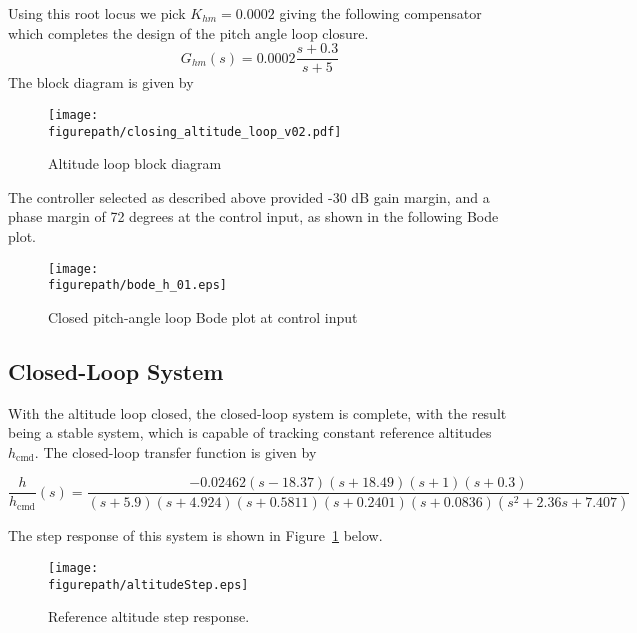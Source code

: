 \documentclass[]{../sty/aiaa-tc}
\newcommand{\figurepath}{../fig}
\theoremstyle{examplestyle}
\begin{document}
  Using this root locus we pick $K_{hm}=0.0002$ giving the following compensator which completes the design of the pitch angle loop closure.
  \begin{equation*}
    G_{hm}(s)=0.0002\frac{s+0.3}{s+5}
  \end{equation*}
  The block diagram is given by
  \begin{figure}[H]
    \begin{center}
      \texttt{[image: \\figurepath/closing\_altitude\_loop\_v02.pdf]}
      \vspace{-0.1in}
      \caption{Altitude loop block diagram}
    \end{center}
  \end{figure}

  The controller selected as described above provided -30 dB gain margin, and a phase margin of 72 degrees at the control input, as shown in the following Bode plot.
  \begin{figure}[H]
    \begin{center}
      \texttt{[image: \\figurepath/bode\_h\_01.eps]}
      \vspace{-0.1in}
      \caption{Closed pitch-angle loop Bode plot at control input}
    \end{center}
  \end{figure}

  \subsection{Closed-Loop System}

  With the altitude loop closed, the closed-loop system is complete, with the result being a stable system, which is capable of tracking constant reference altitudes $h_{\text{cmd}}$.
  The closed-loop transfer function is given by

  \begin{equation*}
    \frac{h}{h_{\text{cmd}}}(s) =
    \frac{-0.02462 (s-18.37) (s+18.49) (s+1) (s+0.3)}
    {(s+5.9) (s+4.924) (s+0.5811) (s+0.2401) (s+0.0836) (s^2 + 2.36s + 7.407)}
  \end{equation*}

  The step response of this system is shown in Figure~\ref{fig.altitudeStep} below.

  \begin{figure}[H]
    \begin{center}
      \texttt{[image: \\figurepath/altitudeStep.eps]}
      \vspace{-0.1in}
      \caption{Reference altitude step response.\label{fig.altitudeStep}}
    \end{center}
  \end{figure}
\end{document}

